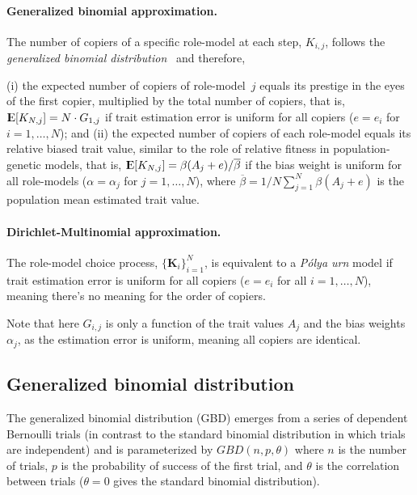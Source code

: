 \documentclass[12pt]{extarticle}
\DeclareMathOperator*{\E}{{\rm I\kern-.3em E}}
\let\vec\mathbf
\begin{document}
\paragraph{Generalized binomial approximation.}  
The number of copiers of a specific role-model at each step, $K_{i,j}$, follows the {\em generalized binomial distribution}~\citep{GBD} and therefore,



(i) the expected number of copiers of role-model~$j$ equals its prestige in the eyes of the first copier, multiplied by the total number of copiers, that is,
$\E[K_{N,j}] = N \cdot G_{1,j}$ if trait estimation error is uniform for all copiers ($e=e_i$ for $i=1, \ldots, N$); and
(ii) the expected number of copiers of each role-model equals its relative biased trait value, similar to the role of relative fitness in population-genetic models, that is, $\E[K_{N,j}] = \beta(A_j+e) / \overline{\beta}$ if the bias weight is uniform for all role-models ($\alpha=\alpha_j$ for $j=1,\ldots,N$), where $\overline{\beta}=1/N \sum_{j=1}^{N}{\beta(A_j+e)}$ is the population mean estimated trait value. 

\paragraph{Dirichlet-Multinomial approximation.}
The role-model choice process, $\{\vec{K}_{i}\}_{i=1}^{N}$, is equivalent to a {\em P\'{o}lya urn} model if trait estimation error is uniform for all copiers ($e=e_i$ for all $i=1, \ldots, N$), meaning there's no meaning for the order of copiers. 

Note that here $G_{i,j}$ is only a function of the trait values $A_j$ and the bias weights $\alpha_j$, as the estimation error is uniform, meaning all copiers are identical.

\subsection*{Generalized binomial distribution}
The generalized binomial distribution (GBD) emerges from a series of dependent Bernoulli trials (in contrast to the standard binomial distribution in which trials are independent) and is parameterized by $GBD(n, p, \theta)$ where $n$ is the number of trials, $p$ is the probability of success of the first trial, and $\theta$ is the correlation between trials ($\theta=0$ gives the standard binomial distribution).
\\
\end{document}

